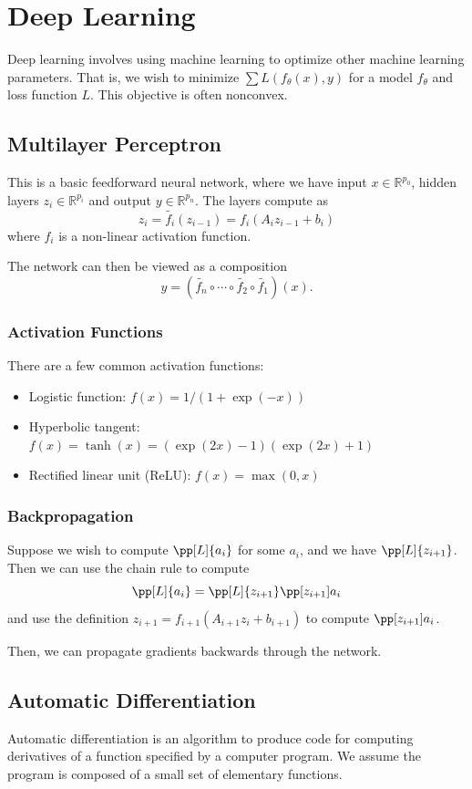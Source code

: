 \documentclass[11pt]{article}
\begin{document}
\newpage 
\section{Deep Learning} 
Deep learning involves using machine learning to optimize other machine learning parameters. That is, we wish to minimize $\sum L(f_\theta(x), y)$ for a model $f_\theta$ and loss function $L$. This objective is often nonconvex. \par

\subsection{Multilayer Perceptron} 
This is a basic feedforward neural network, where we have input $x \in \mathbb{R}^{p_0}$, hidden layers $z_i \in \mathbb{R}^{p_i}$ and output $y \in \mathbb{R}^{p_n}$. The layers compute as 
\[ z_i = \tilde{f_i}(z_{i-1}) = f_i(A_iz_{i-1} + b_i) \] 
where $f_i$ is a non-linear activation function. \par
The network can then be viewed as a composition 
\[ y = (\tilde{f_n} \circ \cdots \circ \tilde{f_2} \circ \tilde{f_1})(x). \] 

\subsubsection*{Activation Functions} 
There are a few common activation functions:
\begin{itemize}
    \item Logistic function: $f(x) = 1 / (1 + \exp(-x))$
    \item Hyperbolic tangent: $f(x) = \tanh(x) = (\exp(2x) - 1)(\exp(2x) + 1)$
    \item Rectified linear unit (ReLU): $f(x) = \max(0, x)$
\end{itemize}

\subsubsection*{Backpropagation}
Suppose we wish to compute $\pp[L]{a_i}$ for some $a_i$, and we have $\pp[L]{z_{i+1}}$. Then we can use the chain rule to compute 
\[ \pp[L]{a_i} = \pp[L]{z_{i+1}}\pp[z_{i+1}]{a_i} \] 
and use the definition $z_{i+1} = f_{i+1}(A_{i+1}z_i + b_{i+1})$ to compute $\pp[z_{i+1}]{a_i}$. \par

Then, we can propagate gradients backwards through the network. 

\subsection{Automatic Differentiation} 
Automatic differentiation is an algorithm to produce code for computing derivatives of a function specified by a computer program. We assume the program is composed of a small set of elementary functions. \par
\end{document}
